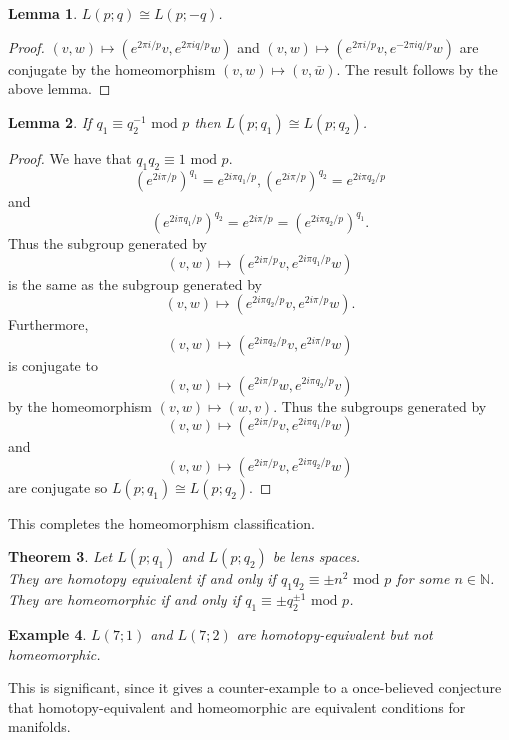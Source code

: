 \documentclass{article}
\newtheorem{theorem}{Theorem}[section]
\newtheorem{lemma}[theorem]{Lemma}
\newtheorem{example}[theorem]{Example}
\begin{document}
\begin{lemma}
$L(p;q)\cong L(p;-q)$.
\end{lemma}
\begin{proof}
$(v,w)\mapsto(e^{2\pi i/p}v,e^{2\pi iq/p}w)$ and $(v,w)\mapsto(e^{2\pi i/p}v,e^{-2\pi iq/p}w)$ are conjugate by the homeomorphism $(v,w)\mapsto(v,\bar w)$. The result follows by the above lemma.
\end{proof}
\begin{lemma}
If $q_1\equiv q_2^{-1}\text{ mod }p$ then $L(p;q_1)\cong L(p;q_2)$.
\end{lemma}
\begin{proof}
We have that $q_1q_2\equiv 1\text{ mod }p$.
\[{(e^{2i\pi/p})}^{q_1}=e^{2i\pi q_1/p},{(e^{2i\pi/p})}^{q_2}=e^{2i\pi q_2/p}\] and \[{(e^{2i\pi q_1/p})}^{q_2}=e^{2i\pi /p}={(e^{2i\pi q_2/p})}^{q_1}.\] Thus the subgroup generated by \[(v,w)\mapsto(e^{2i\pi /p}v,e^{2i\pi q_1/p}w)\] is the same as the subgroup generated by \[(v,w)\mapsto(e^{2i\pi q_2/p}v,e^{2i\pi/p}w).\] Furthermore, \[(v,w)\mapsto(e^{2i\pi q_2/p}v,e^{2i\pi/p}w)\] is conjugate to \[(v,w)\mapsto(e^{2i\pi/p}w,e^{2i\pi q_2/p}v)\] by the homeomorphism $(v,w)\mapsto(w,v)$. Thus the subgroups generated by \[(v,w)\mapsto(e^{2i\pi /p}v,e^{2i\pi q_1/p}w)\] and \[(v,w)\mapsto(e^{2i\pi /p}v,e^{2i\pi q_2/p}w)\] are conjugate so $L(p;q_1)\cong L(p;q_2)$.
\end{proof}

\noindent This completes the homeomorphism classification.

\begin{theorem}
Let $L(p;q_1)$ and $L(p;q_2)$ be lens spaces.\\
They are homotopy equivalent if and only if $q_1q_2\equiv\pm n^2 \text{ mod } p$ for some $n\in\mathbb{N}$.\\
They are homeomorphic if and only if $q_1\equiv\pm q_2^{\pm 1} \text{ mod }p$.
\end{theorem}

\begin{example}
$L(7;1)$ and $L(7;2)$ are homotopy-equivalent but not homeomorphic.
\end{example}
\noindent This is significant, since it gives a counter-example to a once-believed conjecture that homotopy-equivalent and homeomorphic are equivalent conditions for manifolds.
\end{document}
